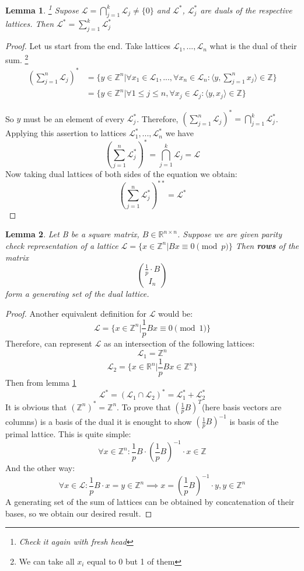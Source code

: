 \documentclass[12pt]{article}
\newcommand{\ZZ}{\mathbb{Z}}
\newcommand{\LL}{\mathcal{L}}
\newtheorem{lemma}{Lemma}
\begin{document}
\begin{lemma}
    \footnote{Check it again with fresh head}
    \label{intersection lemma}
    Supose $\LL = \bigcap_{j=1}^{k} \LL_{j} \neq \{0\}$ and $\LL^{*}$, $\LL_{j}^{*}$ are duals of the respective lattices. Then $\LL^{*} = \sum_{j=1}^{k} \LL_{j}^{*}$
\end{lemma}
\begin{proof}
    Let us start from the end. Take lattices $\LL_{1}, ..., \LL_{n}$ what is the dual of their sum.
    \footnote{We can take all $x_{i}$ equal to 0 but 1 of them}
\[
\begin{split}
(\sum_{j=1}^{n}\LL_j)^{*} & = \{y \in \ZZ^{n} | \forall x_{1} \in \LL_1, ..., \forall x_{n} \in \LL_n: \langle y, \sum_{j=1}^{n} x_{j} \rangle \in \ZZ \} \\
& = \{y \in \ZZ^{n} | \forall 1 \leq j \leq n, \forall x_{j} \in \LL_j: \langle y,  x_{j} \rangle \in \ZZ \}
\end{split}
\]

So $y$ must be an element of every $\LL_{j}^{*}$. Therefore, $(\sum_{j=1}^{n}\LL_j)^{*} = \bigcap_{j=1}^{k} \LL_{j}^{*}$. Applying this assertion to lattices $\LL_{1}^{*}, ..., \LL_{n}^{*}$ we have
\[
(\sum_{j=1}^{n}\LL_j^{*})^{*} = \bigcap_{j=1}^{k} \LL_{j} = \LL
\]
Now taking dual lattices of both sides of the equation we obtain:
\[
(\sum_{j=1}^{n}\LL_j^{*})^{**} = \LL^{*}
\]

\end{proof}

\begin{lemma}
    Let B be a square matrix, $B \in \mathbb{R}^{n \times n}$. Suppose we are given parity check representation of a lattice $\LL = \{x \in \ZZ^{n} | Bx \equiv 0 \pmod{p}\}$
    Then \textbf{rows} of the matrix
    \[
    \binom{\frac{1}{p} \cdot B}{I_{n}}
    \]
    form a generating set of the dual lattice.
\end{lemma}
\begin{proof}
    Another equivalent definition for $\LL$ would be:
    \[
        \LL  = \{x \in \ZZ^{n} | \frac{1}{p}Bx \equiv 0 \pmod{1}\}
    \]
Therefore, can represent $\LL$ as an intersection of the following lattices:
\[
    \LL_{1}  = \ZZ^{n}
\]
\[
    \LL_{2}  = \{x \in \mathbb{R}^{n} | \frac{1}{p}Bx \in \ZZ^{n} \}
\]
Then from lemma \ref{intersection lemma}
\[
    \LL^{*}  = (\LL_{1} \cap \LL_{2})^{*} = \LL_{1}^{*} + \LL_{2}^{*}
\]
It is obvious that $(\ZZ^{n})^{*} = \ZZ^{n}$. To prove that $(\frac{1}{p}B)^{T}$(here basis vectors are columns) is a basis of the dual it is enought to show $(\frac{1}{p}B)^{-1}$ is basis of the primal lattice. This is quite simple:
\[
    \forall x \in \ZZ^{n}: \frac{1}{p}B \cdot (\frac{1}{p}B)^{-1} \cdot x \in \ZZ
\]
And the other way:
\[
    \forall x \in \LL: \frac{1}{p}B \cdot x = y \in \ZZ^{n} \implies x = (\frac{1}{p}B)^{-1} \cdot y , y \in \ZZ^{n}
\]
A generating set of the sum of lattices can be obtained by concatenation of their bases, so we obtain our desired result.
\end{proof}
\end{document}
